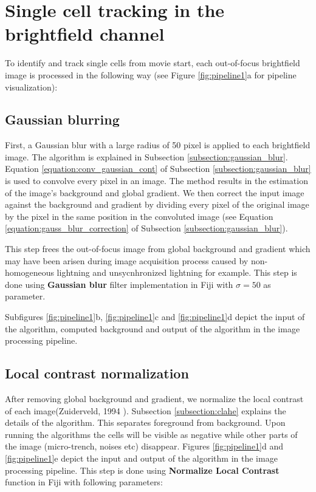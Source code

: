 \documentclass[pdftex,12pt,a4paper]{report}
\begin{document}
\section{Single cell tracking in the brightfield channel}
\label{section:pipeline_brightfield}

To identify and track single cells from movie start, each out-of-focus brightfield image is processed in the following way (see Figure \ref{fig:pipeline1}a for pipeline visualization): 

\subsection{Gaussian blurring}

First, a Gaussian blur  with a large radius of 50 pixel is applied to each brightfield image. The algorithm is explained in Subsection \ref{subsection:gaussian_blur}. Equation \ref{equation:conv_gaussian_cont} of Subsection \ref{subsection:gaussian_blur} is used to convolve every pixel in an image. The method results in the estimation of the image's background and global gradient. We then correct the input image against the background and gradient by dividing every pixel of the original image by the pixel in the same position in the convoluted image (see Equation \ref{equation:gauss_blur_correction} of Subsection \ref{subsection:gaussian_blur}).

This step frees the out-of-focus image from global background and gradient which may have been arisen during image acquisition process caused by non-homogeneous lightning and unsycnhronized lightning for example. This step is done using \textbf{Gaussian blur} filter implementation in Fiji with $\sigma = 50$ as parameter.

Subfigures \ref{fig:pipeline1}b, \ref{fig:pipeline1}c and \ref{fig:pipeline1}d depict the input of the algorithm, computed background and output of the algorithm in the image processing pipeline.

\subsection{Local contrast normalization}

After removing global background and gradient, we normalize the local contrast of each image(Zuiderveld, 1994  \cite{zuiderveld1994contrast}). Subsection \ref{subsection:clahe} explains the details of  the algorithm. This separates foreground from background. Upon running the algorithms the cells will be visible as negative while other parts of the image (micro-trench, noises etc) disappear. Figures \ref{fig:pipeline1}d and \ref{fig:pipeline1}e depict the input and output of the algorithm in the image processing pipeline. This step is done using \textbf{Normalize Local Contrast} function in Fiji with following parameters:
\end{document}
